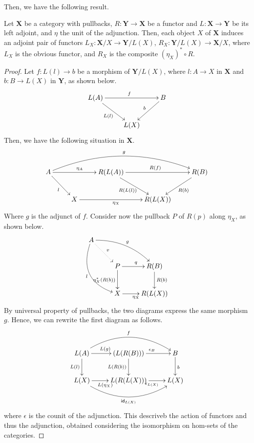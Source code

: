 \documentclass[3p]{elsarticle}
\newcommand{\cat}[1]{\ensuremath{\mathbf{#1}}}
\newcommand{\id}[1]{\mathsf{id}_{#1}}
\theoremstyle{remark}
\theoremstyle{definition}
\begin{document}
Then, we have the following result.

\begin{prop}
	Let $\cat X$ be a category with pullbacks, $R: \cat{Y \to X}$ be a functor and $L: \cat{X \to Y}$ be its left adjoint, and $\eta$ the unit of the adjunction.
	Then, each object $X$ of $\cat X$ induces an adjoint pair of functors $L_X: \cat X/X \to \cat Y/L(X)$, $R_X: \cat Y/L(X) \to \cat X/X$, 
	where $L_X$ is the obvious functor, and $R_X$ is the composite $(\eta_X)^* \circ R$.
\end{prop}

\begin{proof}
	Let $f: L(l) \to b$ be a morphism of $\cat Y/L(X)$, where $l: A \to X$ in $\cat X$ and $b: B \to L(X)$ in $\cat Y$, as shown below.
	\[\xymatrix{L(A)\ar[rr]^{f}\ar[dr]_{L(l)}&&B\ar[dl]_{b}\\&L(X)}\]
	Then, we have the following situation in $\cat X$.
	\[\xymatrix{
			A \ar[rr]^{\eta_A}\ar[dr]_{l} \ar@/^2.0pc/@[black][rrrr]^{g} && R(L(A)) \ar[rr]^{R(f)} \ar[dr]_{R(L(l))} && R(B) \ar[dl]^{R(b)}\\
						      & X \ar[rr]_{\eta_X} && R(L(X))
	}\]
	Where $g$ is the adjunct of $f$.
	Consider now the pullback $P$ of $R(p)$ along $\eta_X$, as shown below.
	\[\xymatrix{
		A \ar@/^1.0pc/[drr]^{g}\ar@/_2.0pc/[ddr]_{l} \ar@{.>}[dr]^{v}\\&P\ar[r]^{q}\ar[d]_{\eta_X^*(R(b))}&R(B)\ar[d]^{R(b)}\\&X \ar[r]_{\eta_X}&R(L(X))
	}\]
	By universal property of pullbacks, the two diagrams express the same morphism $g$.
	Hence, we can rewrite the first diagram as follows.
	\[\xymatrix{
			L(A)\ar[r]^{L(g)}\ar[d]_{L(l)}\ar@/^2.0pc/[rr]^{f}&(L(R(B)))\ar[d]_{L(R(b))}\ar[r]^{\epsilon_B}&B\ar[d]^{b}\\
			L(X)\ar[r]_{L(\eta_X)}\ar@/_2.0pc/[rr]_{\id{L(X)}}&L(R(L(X)))\ar[r]_{\epsilon_{L(X)}}& L(X)
	}\]
	where $\epsilon$ is the counit of the adjunction.
	This descriveb the action of functors and thus the adjunction, obtained considering the isomorphism on hom-sets of the categories.

\end{proof}
\fi

\end{document}
